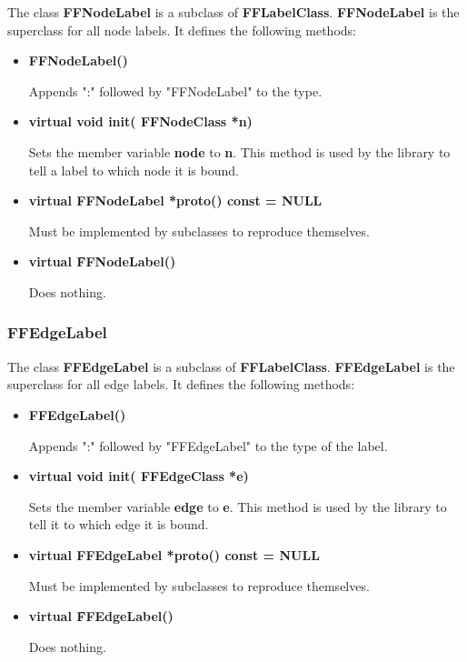The class {\bf FFNodeLabel} is a subclass of {\bf FFLabelClass}. 
{\bf FFNodeLabel} is the superclass for all node labels. It defines
the following methods:

\begin{itemize}

\item{\bf FFNodeLabel()}

Appends ":" followed by "FFNodeLabel" to the type. 

\item{\bf virtual void init( FFNodeClass *n)}

Sets the member variable {\bf node} to {\bf n}. This method
is used by the library to tell a label to which node it is
bound.

\item{\bf virtual FFNodeLabel *proto() const = NULL}

Must be implemented by subclasses to reproduce themselves.

\item{\bf virtual \~FFNodeLabel()}

Does nothing.

\end{itemize}

\subsubsection{FFEdgeLabel}

The class {\bf FFEdgeLabel} is a subclass of {\bf FFLabelClass}. 
{\bf FFEdgeLabel} is the superclass for all edge labels. It defines
the following methods:

\begin{itemize}

\item{\bf FFEdgeLabel()}

Appends ":" followed by "FFEdgeLabel" to the type of the label.

\item{\bf virtual void init( FFEdgeClass *e)}

Sets the member variable {\bf edge} to {\bf e}. This method is used
by the library to tell it to which edge it is bound.

\item{\bf virtual FFEdgeLabel *proto() const = NULL}

Must be implemented by subclasses to reproduce themselves.

\item{\bf virtual \~FFEdgeLabel()}

Does nothing.

\end{itemize}

